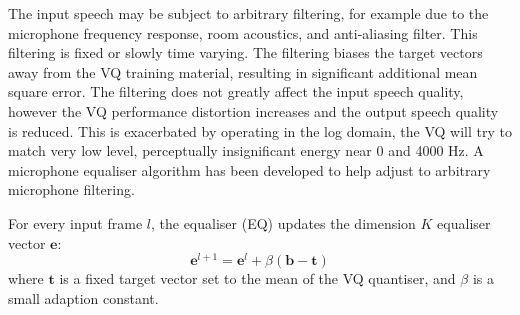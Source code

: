 \documentclass{article}
\begin{document}
The input speech may be subject to arbitrary filtering, for example due to the microphone frequency response, room acoustics, and anti-aliasing filter.  This filtering is fixed or slowly time varying.  The filtering biases the target vectors away from the VQ training material, resulting in significant additional mean square error.  The filtering does not greatly affect the input speech quality, however the VQ performance distortion increases and the output speech quality is reduced.  This is exacerbated by operating in the log domain, the VQ will try to match very low level, perceptually insignificant energy near 0 and 4000 Hz. A microphone equaliser algorithm has been developed to help adjust to arbitrary microphone filtering.

For every input frame $l$, the equaliser (EQ) updates the dimension $K$ equaliser vector $\mathbf{e}$:
\begin{equation}
\mathbf{e}^{l+1} = \mathbf{e}^l + \beta(\mathbf{b} - \mathbf{t})
\end{equation}
where $\mathbf{t}$ is a fixed target vector set to the mean of the VQ quantiser, and $\beta$ is a small adaption constant.
\end{document}
